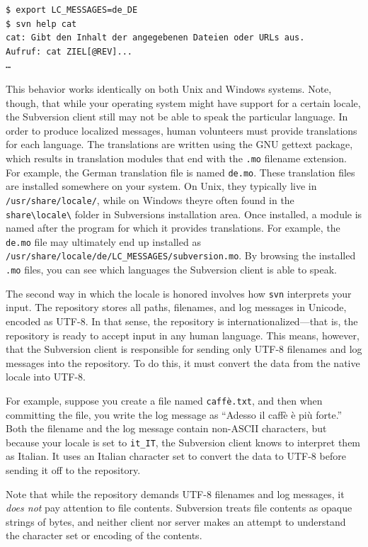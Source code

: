 \begin{verbatim}
$ export LC_MESSAGES=de_DE
$ svn help cat
cat: Gibt den Inhalt der angegebenen Dateien oder URLs aus.
Aufruf: cat ZIEL[@REV]...
…
\end{verbatim}

This behavior works identically on both Unix and Windows systems. Note,
though, that while your operating system might have support for a
certain locale, the Subversion client still may not be able to speak the
particular language. In order to produce localized messages, human
volunteers must provide translations for each language. The translations
are written using the GNU gettext package, which results in translation
modules that end with the \texttt{.mo} filename extension. For example,
the German translation file is named \texttt{de.mo}. These translation
files are installed somewhere on your system. On Unix, they typically
live in \texttt{/usr/share/locale/}, while on Windows
they\textquotesingle re often found in the
\texttt{share\textbackslash{}locale\textbackslash{}} folder in
Subversion\textquotesingle s installation area. Once installed, a module
is named after the program for which it provides translations. For
example, the \texttt{de.mo} file may ultimately end up installed as
\texttt{/usr/share/locale/de/LC\_MESSAGES/subversion.mo}. By browsing
the installed \texttt{.mo} files, you can see which languages the
Subversion client is able to speak.

The second way in which the locale is honored involves how \texttt{svn}
interprets your input. The repository stores all paths, filenames, and
log messages in Unicode, encoded as UTF-8. In that sense, the repository
is internationalized---that is, the repository is ready to accept input
in any human language. This means, however, that the Subversion client
is responsible for sending only UTF-8 filenames and log messages into
the repository. To do this, it must convert the data from the native
locale into UTF-8.

For example, suppose you create a file named \texttt{caffè.txt}, and
then when committing the file, you write the log message as ``Adesso il
caffè è più forte.'' Both the filename and the log message contain
non-ASCII characters, but because your locale is set to \texttt{it\_IT},
the Subversion client knows to interpret them as Italian. It uses an
Italian character set to convert the data to UTF-8 before sending it off
to the repository.

Note that while the repository demands UTF-8 filenames and log messages,
it \emph{does not} pay attention to file contents. Subversion treats
file contents as opaque strings of bytes, and neither client nor server
makes an attempt to understand the character set or encoding of the
contents.

